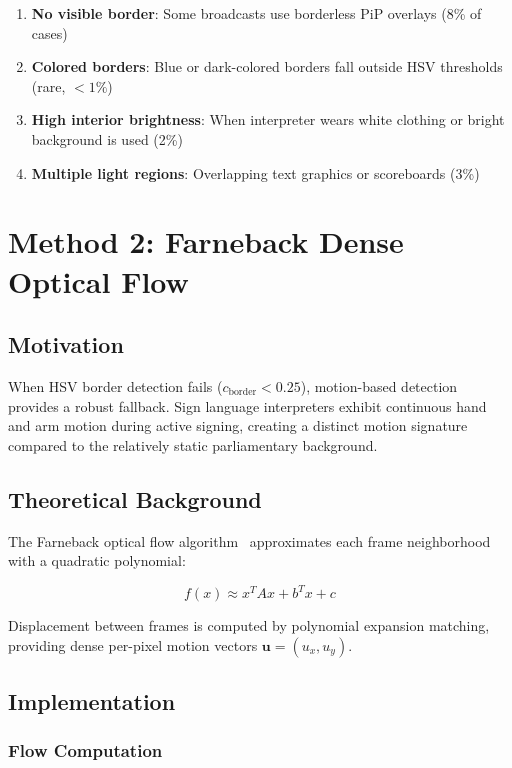 \documentclass[11pt,a4paper]{article}
\begin{document}
\begin{enumerate}
    \item \textbf{No visible border}: Some broadcasts use borderless PiP overlays (8\% of cases)
    \item \textbf{Colored borders}: Blue or dark-colored borders fall outside HSV thresholds (rare, $<1\%$)
    \item \textbf{High interior brightness}: When interpreter wears white clothing or bright background is used (2\%)
    \item \textbf{Multiple light regions}: Overlapping text graphics or scoreboards (3\%)
\end{enumerate}

\section{Method 2: Farneback Dense Optical Flow}

\subsection{Motivation}

When HSV border detection fails ($c_{\text{border}} < 0.25$), motion-based detection provides a robust fallback. Sign language interpreters exhibit continuous hand and arm motion during active signing, creating a distinct motion signature compared to the relatively static parliamentary background.

\subsection{Theoretical Background}

The Farneback optical flow algorithm~\cite{farneback2003two} approximates each frame neighborhood with a quadratic polynomial:

\begin{equation}
f(x) \approx x^T A x + b^T x + c
\end{equation}

Displacement between frames is computed by polynomial expansion matching, providing dense per-pixel motion vectors $\mathbf{u} = (u_x, u_y)$.

\subsection{Implementation}

\subsubsection{Flow Computation}
\end{document}
